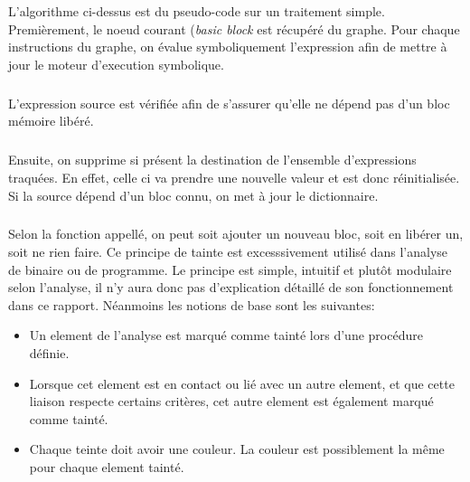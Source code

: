 L'algorithme ci-dessus est du pseudo-code sur un traitement simple.
Premièrement, le noeud courant (\textit{basic block} est récupéré du graphe. Pour chaque instructions du graphe, on évalue symboliquement
l'expression afin de mettre à jour le moteur d'execution symbolique.
\subparagraph{}
L'expression source est vérifiée afin de s'assurer qu'elle ne dépend pas d'un bloc mémoire libéré.
\subparagraph{}
Ensuite, on supprime si présent la destination de l'ensemble d'expressions traquées. En effet, celle ci va prendre une nouvelle valeur et est donc
réinitialisée. Si la source dépend d'un bloc connu, on met à jour le dictionnaire.
\subparagraph{}
Selon la fonction appellé, on peut soit ajouter un nouveau bloc, soit en libérer un, soit ne rien faire.
Ce principe de tainte est excesssivement utilisé dans l'analyse de binaire ou de programme. Le principe est simple, intuitif et plutôt modulaire selon l'analyse, il n'y aura
donc pas d'explication détaillé de son fonctionnement dans ce rapport. Néanmoins les notions de base sont les suivantes:
\begin{itemize}
        \item Un element de l'analyse est marqué comme tainté lors d'une procédure définie.
        \item Lorsque cet element est en contact ou lié avec un autre element, et que cette liaison respecte certains
            critères, cet autre element est également marqué comme tainté.
        \item Chaque teinte doit avoir une couleur. La couleur est possiblement la même pour chaque element tainté.
\end{itemize}

